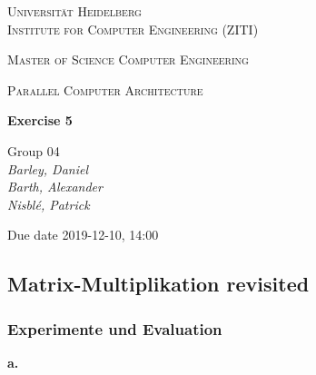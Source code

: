 \documentclass[12pt]{article}
\newcommand{\lecture}{Parallel Computer Architecture}
\newcommand{\exercise}{Exercise 5}
\newcommand{\groupnumber}{Group 04}
\newcommand{\groupmemberslist}{Barley, Daniel\\Barth, Alexander\\Nisblé, Patrick}
\newcommand{\duedate}{2019-12-10, 14:00}
\begin{document}
	\begin{titlepage}
		\centering
		
		{\scshape\LARGE Universität Heidelberg\\Institute for Computer Engineering (ZITI) \par}
		\vspace{1.5cm}
		{\scshape\Large Master of Science Computer Engineering \par}
		\vspace{0.5cm}
		{\scshape\Large \lecture \par}
		\vspace{1.5cm}
		{\huge\bfseries \exercise \par}
		\vspace{2cm}
		{\Large \groupnumber \itshape  \\ \groupmemberslist \par}
		\vfill
		
		
		{\large Due date \duedate \par}
	\end{titlepage}

\setcounter{section}{5}
\subsection{Matrix-Multiplikation revisited}
\setcounter{subsubsection}{1}

\subsubsection{Experimente und Evaluation}

\noindent \textbf{a.}
\end{document}
